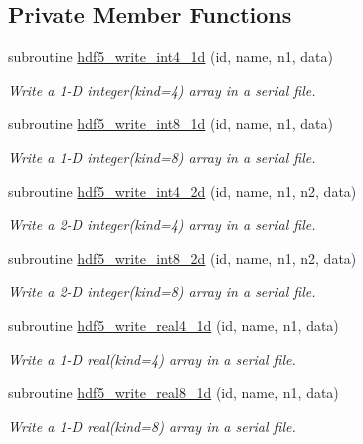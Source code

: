 \subsection*{Private Member Functions}
\begin{DoxyCompactItemize}
\item 
subroutine \hyperlink{classmodhdf5_a85487dfda18b03bd8b48100b016240b3}{hdf5\-\_\-write\-\_\-int4\-\_\-1d} (id, name, n1, data)
\begin{DoxyCompactList}\small\item\em Write a 1-\/\-D integer(kind=4) array in a serial file. \end{DoxyCompactList}\item 
subroutine \hyperlink{classmodhdf5_af39615b3539b84afc3890884aafec217}{hdf5\-\_\-write\-\_\-int8\-\_\-1d} (id, name, n1, data)
\begin{DoxyCompactList}\small\item\em Write a 1-\/\-D integer(kind=8) array in a serial file. \end{DoxyCompactList}\item 
subroutine \hyperlink{classmodhdf5_ab39fa5690f5f029a8beea46dd8030b1d}{hdf5\-\_\-write\-\_\-int4\-\_\-2d} (id, name, n1, n2, data)
\begin{DoxyCompactList}\small\item\em Write a 2-\/\-D integer(kind=4) array in a serial file. \end{DoxyCompactList}\item 
subroutine \hyperlink{classmodhdf5_abcc24e701a795a92f16c6d4c1eb034c7}{hdf5\-\_\-write\-\_\-int8\-\_\-2d} (id, name, n1, n2, data)
\begin{DoxyCompactList}\small\item\em Write a 2-\/\-D integer(kind=8) array in a serial file. \end{DoxyCompactList}\item 
subroutine \hyperlink{classmodhdf5_a5f075a274076e480eee835fd3b9573af}{hdf5\-\_\-write\-\_\-real4\-\_\-1d} (id, name, n1, data)
\begin{DoxyCompactList}\small\item\em Write a 1-\/\-D real(kind=4) array in a serial file. \end{DoxyCompactList}\item 
subroutine \hyperlink{classmodhdf5_aed41c10954f7cb054d46df0c012d147d}{hdf5\-\_\-write\-\_\-real8\-\_\-1d} (id, name, n1, data)
\begin{DoxyCompactList}\small\item\em Write a 1-\/\-D real(kind=8) array in a serial file. \end{DoxyCompactList}\item 

\end{DoxyCompactItemize}

